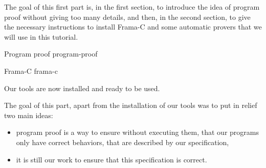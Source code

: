 The goal of this first part is, in the first section, to introduce the
idea of program proof without giving too many details, and then, in the
second section, to give the necessary instructions to install Frama-C
and some automatic provers that we will use in this tutorial.



\begin{levelTwo}
  {Program proof}
  {program-proof}
\end{levelTwo}

\begin{levelTwo}
  {Frama-C}
  {frama-c}
\end{levelTwo}



\horizontalLine
\newpage


Our tools are now installed and ready to be used.



The goal of this part, apart from the installation of our tools was to put
in relief two main ideas:
\begin{itemize}
\item program proof is a way to ensure without executing them, that our programs
  only have correct behaviors, that are described by our specification,
\item it is still our work to ensure that this specification is correct.
\end{itemize}
